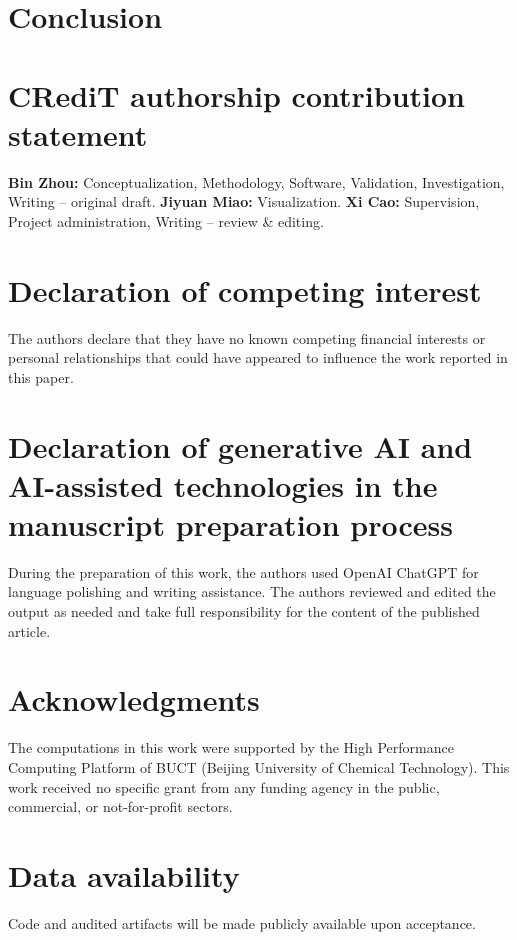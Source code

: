 \documentclass[5p]{elsarticle}
\theoremstyle{remark}
\newcommand{\artifactavailability}{Code and audited artifacts will be made
  publicly available upon acceptance.}
\newcommand{\artifactavailability}{The source code, frozen audited result
  artifacts, replay manifests, and analysis scripts supporting this study are
  publicly available in the RevTrace repository at
  \url{https://github.com/zhouz4884-coder/RevTrace}.}
\begin{document}
\section{Conclusion}\label{sec:conclusion}


\ifdefined\blindreview\else
  \section*{CRediT authorship contribution statement}
  \textbf{Bin Zhou:} Conceptualization, Methodology, Software, Validation,
  Investigation, Writing -- original draft.
  \textbf{Jiyuan Miao:} Visualization.
  \textbf{Xi Cao:} Supervision, Project administration, Writing -- review \&
  editing.
\fi

\section*{Declaration of competing interest}
The authors declare that they have no known competing financial interests
or personal relationships that could have appeared to influence the work
reported in this paper.

\section*{Declaration of generative AI and AI-assisted technologies in the
manuscript preparation process}
During the preparation of this work, the authors used OpenAI ChatGPT for
language polishing and writing assistance. The authors reviewed and edited
the output as needed and take full responsibility for the content of the
published article.

\ifdefined\blindreview\else
  \section*{Acknowledgments}
  The computations in this work were supported by the High Performance
  Computing Platform of BUCT (Beijing University of Chemical Technology).
  This work received no specific grant from any funding agency in the public,
  commercial, or not-for-profit sectors.
\fi

\section*{Data availability}
\artifactavailability



\end{document}
